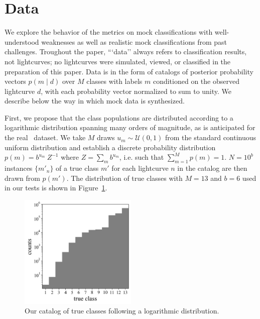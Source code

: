 \section{Data}
\label{sec:data}

We explore the behavior of the metrics on mock classifications with well-understood weaknesses as well as realistic mock classifications from past challenges.
Troughout the paper, ```data'' always refers to classification results, not lightcurves; no lightcurves were simulated, viewed, or classified in the preparation of this paper.
Data is in the form of catalogs of posterior probability vectors $p(m \mid d)$ over $M$ classes with labels $m$ conditioned on the observed lightcurve $d$, with each probability vector normalized to sum to unity.
We describe below the way in which mock data is synthesized.

First, we propose that the class populations are distributed according to a logarithmic distribution spanning many orders of magnitude, as is anticipated for the real \lsst\ dataset.
We take $M$ draws $u_{m} \sim \mathcal{U}(0, 1)$ from the standard continuous uniform distribution and establish a discrete probability distribution $p(m) = b^{u_{m}}\ Z^{-1}$ where $Z = \sum_{m} b^{u_{m}}$, i.e. such that $\sum_{m=1}^{M} p(m) = 1$.
$N = 10^{b}$ instances $\{m'_{n}\}$ of a true class $m'$ for each lightcurve $n$ in the catalog are then drawn from $p(m')$.
The distribution of true classes with $M = 13$ and $b = 6$ used in our tests is shown in Figure~\ref{fig:classdist}.

\begin{figure}
	\begin{center}
    \includegraphics[width=0.5\textwidth]{./fig/complete_counts.png}
		\caption{Our catalog of true classes following a logarithmic distribution.}
		\label{fig:classdist}
	\end{center}
\end{figure}


